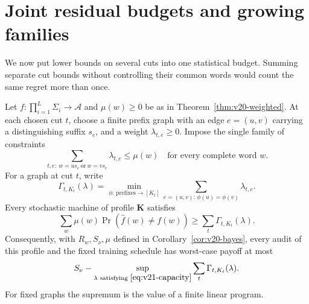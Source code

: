 \section{Joint residual budgets and growing families}
\label{sec:v21-joint}
We now put lower bounds on several cuts into one statistical budget.
Summing separate cut bounds without controlling their common words
would count the same regret more than once.

\begin{theorem}
\label{thm:v21-joint}
Let $f:\prod_{i=1}^L\Sigma_i\to\mathcal A$ and $\mu(w)\ge0$ be as
in Theorem~\ref{thm:v20-weighted}. At each chosen cut $t$, choose a
finite prefix graph with an edge $e=(u,v)$ carrying a distinguishing
suffix $s_e$, and a weight $\lambda_{t,e}\ge0$. Impose the single family
of constraints
\begin{equation}\label{eq:v21-capacity}
 \sum_{t,e:\ w=us_e\ \text{or}\ w=vs_e}\lambda_{t,e}\le\mu(w)
 \quad\text{for every complete word }w.
\end{equation}
For a graph at cut $t$, write
\[
 \Gamma_{t,K_t}(\lambda)=
 \min_{\phi:\,\text{prefixes}\to[K_t]}
       \sum_{e=(u,v):\,\phi(u)=\phi(v)}\lambda_{t,e}.
\]
Every stochastic machine of profile $\mathbf K$ satisfies
\begin{equation}\label{eq:v21-joint-bound}
 \sum_w\mu(w)\Pr(\widehat f(w)\ne f(w))
       \ge\sum_t\Gamma_{t,K_t}(\lambda).
\end{equation}
Consequently, with $R_w,S_\nu,\mu$ defined in
Corollary~\ref{cor:v20-bayes}, every audit of this profile and the fixed
training schedule has worst-case payoff at most
\begin{equation}\label{eq:v21-joint-bayes}
 S_\nu-\sup_{\lambda\text{ satisfying }\eqref{eq:v21-capacity}}
                    \sum_t\Gamma_{t,K_t}(\lambda).
\end{equation}
For fixed graphs the supremum is the value of a finite linear program.
\end{theorem}
